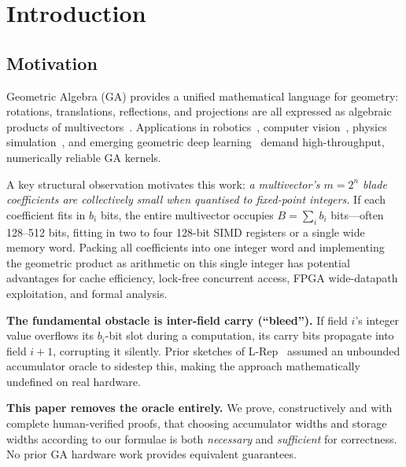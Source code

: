 \documentclass[11pt,a4paper]{article}
\theoremstyle{definition}
\theoremstyle{plain}
\theoremstyle{remark}
\begin{document}
\tableofcontents
\newpage

\section{Introduction}
\label{sec:intro}

\subsection{Motivation}

Geometric Algebra (GA) provides a unified mathematical language for
geometry: rotations, translations, reflections, and projections are all
expressed as algebraic products of multivectors~\cite{hestenes1984,dorst2007}.
Applications in robotics~\cite{selig2005}, computer vision~\cite{lasenby1998},
physics simulation~\cite{doran2003}, and emerging geometric deep
learning~\cite{brandstetter2023} demand high-throughput, numerically
reliable GA kernels.

A key structural observation motivates this work: \emph{a
multivector's $m = 2^n$ blade coefficients are collectively small when
quantised to fixed-point integers.}
If each coefficient fits in $b_i$ bits, the entire multivector occupies
$B = \sum_i b_i$ bits---often 128--512 bits, fitting in two to four
128-bit SIMD registers or a single wide memory word.
Packing all coefficients into one integer word and implementing the
geometric product as arithmetic on this single integer has potential
advantages for cache efficiency, lock-free concurrent access, FPGA
wide-datapath exploitation, and formal analysis.

\textbf{The fundamental obstacle is inter-field carry (``bleed'').}
If field $i$'s integer value overflows its $b_i$-bit slot during a
computation, its carry bits propagate into field $i+1$, corrupting it
silently.
Prior sketches of L-Rep~\cite{dang2025sketch} assumed an unbounded
accumulator oracle to sidestep this, making the approach mathematically
undefined on real hardware.

\textbf{This paper removes the oracle entirely.}
We prove, constructively and with complete human-verified proofs, that
choosing accumulator widths and storage widths according to our formulae
is both \emph{necessary} and \emph{sufficient} for correctness.
No prior GA hardware work provides equivalent guarantees.
\end{document}
